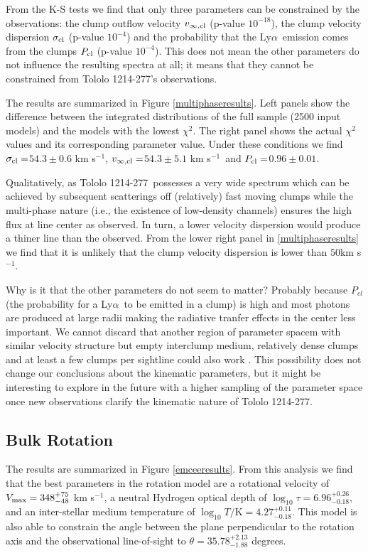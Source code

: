 \documentclass[a4,useAMS,usenatbib,usegraphicx]{mn2e}
\newcommand{\tol}{Tololo 1214-277}
\newcommand{\lya}{Ly$\alpha$}
\newcommand{\kms}{km s$^{-1}$}
\newcommand{\sigmaclump}{$54.3\pm 0.6$ km s$^{-1}$}
\newcommand{\inftyclump}{$54.3\pm 5.1$ km s$^{-1}$}
\newcommand{\probaclump}{$0.96\pm 0.01$}
\begin{document}
From the K-S tests we find that only three parameters can be
constrained by the observations: the clump outflow velocity
$v_{\infty,\rm{cl}}$ (p-value  $10^{-18}$), the clump velocity
dispersion $\sigma_{\rm cl}$ (p-value $10^{-4}$) and the probability
that the \lya\ emission comes from the clumps $P_{\rm cl}$ (p-value
$10^{-4}$).
This does not mean the other parameters do not influence the resulting
spectra at all; it means that they cannot be constrained from \tol's
observations.


The results are summarized in Figure \ref{multiphaseresults}.
Left panels show the difference between the integrated distributions
of the full sample (2500 input models) and the models with the lowest
$\chi^2$. 
The right panel shows the actual $\chi^2$ values and its corresponding
parameter value. 
Under these conditions we find $\sigma_{\rm cl}=$\sigmaclump,
$v_{\infty {\rm, cl}}=$\inftyclump\ and $P_{\rm cl}=$\probaclump. 

Qualitatively, as \tol\ possesses a very wide spectrum which can be
achieved by subsequent scatterings off (relatively) fast moving clumps
while the multi-phase nature (i.e., the existence of low-density
channels) ensures the high flux at line center as observed.
In turn, a lower velocity dispersion would produce a thiner line than the
observed.
From the lower right panel in \ref{multiphaseresults} we find that it
is unlikely that the clump velocity dispersion is lower than
$50$\kms. 

Why is it that the other parameters do not seem to matter? Probably
because $P_{cl}$ (the probability for a \lya\ to be emitted in a
clump) is high and most photons are produced at
large radii making the radiative tranfer effects in the center less
important.  
We cannot discard that another region of parameter spacem with similar
velocity structure but empty interclump medium, relatively dense
clumps and at least a few clumps per sightline 
could also work \citep{Hansen06}.
This possibility does not change our conclusions about the
kinematic parameters, but it might be interesting to explore in the
future with a higher sampling of the parameter space once new
observations clarify the kinematic nature of \tol.  

\subsection{Bulk Rotation}


The results are summarized in  Figure \ref{emceeresults}. 
From this analysis we find that the best parameters in the rotation
model are a rotational velocity of  $V_{\rm max}=348^{+75}_{-48}$
\kms, a neutral Hydrogen optical depth of
$\log_{10}\tau=6.96^{+0.26}_{-0.18}$,  and an inter-stellar medium
temperature of $\log_{10} T/\mathrm {K} = 4.27^{+0.11}_{-0.18}$.   
This model is also able to constrain the angle between the plane
perpendicular to the rotation axis and the observational line-of-sight
to $\theta = 35.78^{+2.13}_{-1.88}$ degrees.
\end{document}
